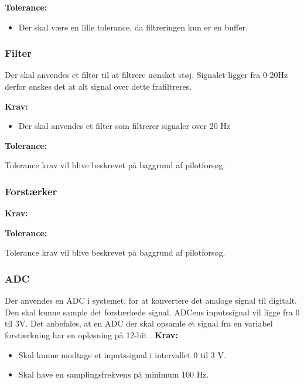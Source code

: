 \textbf{Tolerance:}
\begin{itemize}
Tolerance krav vil blive beskrevet på baggrund af pilotforsøg.
\item Der skal være en lille tolerance, da filtreringen kun er en buffer. 
\end{itemize}

\subsubsection{Filter}
Der skal anvendes et filter til at filtrere uønsket støj. Signalet ligger fra 0-20Hz derfor ønskes det at alt signal over dette frafiltreres. 

\textbf{Krav:}
\begin{itemize}
\item Der skal anvendes et filter som filtrerer signaler over 20 Hz
\end{itemize}

\textbf{Tolerance:}
\begin{itemize}
Tolerance krav vil blive beskrevet på baggrund af pilotforsøg.
\end{itemize}

\subsubsection{Forstærker}
\textbf{Krav:}
\begin{itemize}

\end{itemize}

\textbf{Tolerance:}
\begin{itemize}
Tolerance krav vil blive beskrevet på baggrund af pilotforsøg.
\end{itemize}

\subsubsection{ADC}
Der anvendes en ADC i systemet, for at konvertere det analoge signal til digitalt. Den skal kunne sample det forstærkede signal. ADCens inputssignal vil ligge fra 0 til 3V. Det anbefales, at en ADC der skal opsamle et signal fra en variabel forstærkning har en opløsning på 12-bit \cite{Zouridakis2003}.
\textbf{Krav:}
\begin{itemize}
\item Skal kunne modtage et inputssignal i intervallet 0 til 3 V.
\item Skal have en samplingsfrekvens på minimum 100 Hz. 
\end{itemize}

